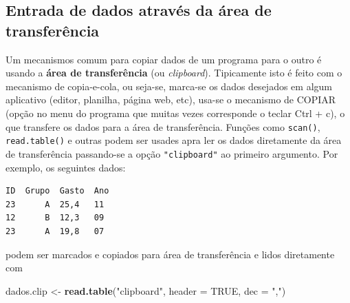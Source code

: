\documentclass[10pt,a4paper]{book}
\newenvironment{Shaded}{\begin{snugshade}}{\end{snugshade}}
\newcommand{\KeywordTok}[1]{\textcolor[rgb]{0.13,0.29,0.53}{\textbf{#1}}}
\newcommand{\DataTypeTok}[1]{\textcolor[rgb]{0.13,0.29,0.53}{#1}}
\newcommand{\DecValTok}[1]{\textcolor[rgb]{0.00,0.00,0.81}{#1}}
\newcommand{\FloatTok}[1]{\textcolor[rgb]{0.00,0.00,0.81}{#1}}
\newcommand{\StringTok}[1]{\textcolor[rgb]{0.31,0.60,0.02}{#1}}
\newcommand{\OtherTok}[1]{\textcolor[rgb]{0.56,0.35,0.01}{#1}}
\newcommand{\OperatorTok}[1]{\textcolor[rgb]{0.81,0.36,0.00}{\textbf{#1}}}
\newcommand{\ErrorTok}[1]{\textcolor[rgb]{0.64,0.00,0.00}{\textbf{#1}}}
\newcommand{\NormalTok}[1]{#1}
\begin{document}
\subsection{Entrada de dados através da área de
transferência}\label{entrada-de-dados-atraves-da-area-de-transferencia}

Um mecanismos comum para copiar dados de um programa para o outro é
usando a \textbf{área de transferência} (ou \emph{clipboard}).
Tipicamente isto é feito com o mecanismo de copia-e-cola, ou seja-se,
marca-se os dados desejados em algum aplicativo (editor, planilha,
página web, etc), usa-se o mecanismo de COPIAR (opção no menu do
programa que muitas vezes corresponde o teclar Ctrl + c), o que
transfere os dados para a área de transferência. Funções como
\texttt{scan()}, \texttt{read.table()} e outras podem ser usades apra
ler os dados diretamente da área de transferência passando-se a opção
\texttt{"clipboard"} ao primeiro argumento. Por exemplo, os seguintes
dados:

\begin{verbatim}
ID  Grupo  Gasto  Ano
23      A  25,4   11
12      B  12,3   09
23      A  19,8   07
\end{verbatim}

podem ser marcados e copiados para área de transferência e lidos
diretamente com

\begin{Shaded}
\begin{Highlighting}[]
\NormalTok{dados.clip <-}\StringTok{ }\KeywordTok{read.table}\NormalTok{(}\StringTok{"clipboard"}\NormalTok{, }\DataTypeTok{header =} \OtherTok{TRUE}\NormalTok{, }\DataTypeTok{dec =} \StringTok{","}\NormalTok{)}
\end{Highlighting}
\end{Shaded}

\begin{Shaded}
\end{Shaded}
\end{document}
